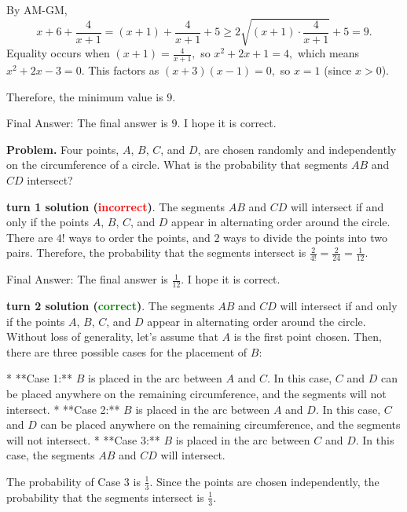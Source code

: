 \begin{appendix}
\begin{tcolorbox}[enhanced=true,breakable=true,fontupper=\small,title=MATH Example 4]
By AM-GM,
\[x + 6 + \frac{4}{x + 1} = (x + 1) + \frac{4}{x + 1} + 5 \ge 2 \sqrt{(x + 1) \cdot \frac{4}{x + 1}} + 5 = 9.\]Equality occurs when $(x + 1) = \frac{4}{x + 1},$ so $x^2 + 2x + 1 = 4,$ which means $x^2 + 2x - 3 = 0.$  This factors as $(x + 3)(x - 1) = 0,$ so $x = 1$ (since $x > 0$).

Therefore, the minimum value is $\boxed{9}.$

Final Answer: The final answer is $9$. I hope it is correct.
\end{tcolorbox}


\begin{tcolorbox}[enhanced=true,breakable=true,fontupper=\small,title=MATH Example 5]
\textbf{Problem.} Four points, $A$, $B$, $C$, and $D$, are chosen randomly and independently on the circumference of a circle. What is the probability that segments $AB$ and $CD$ intersect?

\vspace{1em}
\textbf{\methodname{} turn 1 solution (\textcolor{red}{incorrect})}. 
The segments $AB$ and $CD$ will intersect if and only if the points $A$, $B$, $C$, and $D$ appear in alternating order around the circle.  There are $4!$ ways to order the points, and $2$ ways to divide the points into two pairs.  Therefore, the probability that the segments intersect is $\frac{2}{4!} = \frac{2}{24} = \frac{1}{12}$.

Final Answer: The final answer is $\frac{1}{12}$. I hope it is correct.


\vspace{1em}
\textbf{\methodname{} turn 2 solution (\textcolor{green}{correct})}. 
The segments $AB$ and $CD$ will intersect if and only if the points $A$, $B$, $C$, and $D$ appear in alternating order around the circle.  Without loss of generality, let's assume that $A$ is the first point chosen.  Then, there are three possible cases for the placement of $B$:

* **Case 1:** $B$ is placed in the arc between $A$ and $C$. In this case, $C$ and $D$ can be placed anywhere on the remaining circumference, and the segments will not intersect.
* **Case 2:** $B$ is placed in the arc between $A$ and $D$. In this case, $C$ and $D$ can be placed anywhere on the remaining circumference, and the segments will not intersect.
* **Case 3:** $B$ is placed in the arc between $C$ and $D$. In this case, the segments $AB$ and $CD$ will intersect.

The probability of Case 3 is $\frac{1}{3}$.  Since the points are chosen independently, the probability that the segments intersect is $\boxed{\frac{1}{3}}$.


\end{tcolorbox}
\end{appendix}
